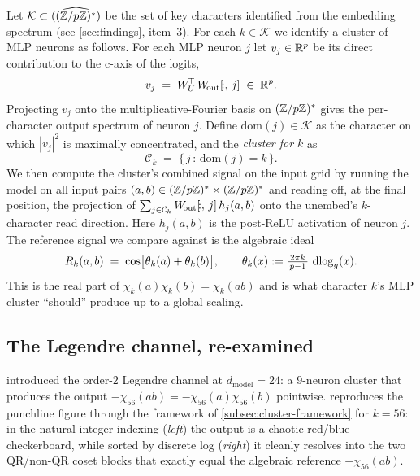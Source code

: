 Let $\mathcal{K} \subset \widehat{((\mathbb{Z}/p\mathbb{Z})^*)}$ be the set of key
characters identified from the embedding spectrum (see
\cref{sec:findings}, item~3).  For each $k \in \mathcal{K}$ we identify
a cluster of MLP neurons as follows.  For each MLP neuron $j$ let
$v_j \in \mathbb{R}^p$ be its direct contribution to the c-axis of the logits,
\begin{equation}
  v_j \;=\; W_U^{\!\top}\,W_{\!\text{out}}[\!:,\,j] \;\in\; \mathbb{R}^p.
  \label{eq:cluster-vj}
\end{equation}
Projecting $v_j$ onto the multiplicative-Fourier basis on $(\mathbb{Z}/p\mathbb{Z})^*$
gives the per-character output spectrum of neuron $j$.  Define
$\mathrm{dom}(j) \in \mathcal{K}$ as the character on which $|v_j|^2$ is
maximally concentrated, and the \emph{cluster for $k$} as
\begin{equation}
  \mathcal{C}_k \;=\; \{\,j \,:\, \mathrm{dom}(j) = k\,\}.
\end{equation}
We then compute the cluster's combined signal on the input grid by
running the model on all input pairs $(a, b) \in (\mathbb{Z}/p\mathbb{Z})^* \times
(\mathbb{Z}/p\mathbb{Z})^*$ and reading off, at the final position, the projection of
$\sum_{j \in \mathcal{C}_k} W_{\!\text{out}}[\!:,\,j]\,h_j(a, b)$ onto the
unembed's $k$-character read direction.  Here $h_j(a, b)$ is the
post-ReLU activation of neuron $j$.  The reference signal we compare
against is the algebraic ideal
\begin{equation}
  R_k(a, b) \;=\; \cos\!\big[\theta_k(a) + \theta_k(b)\big],
  \qquad \theta_k(x) := \tfrac{2\pi k}{\,p-1\,}\,\operatorname{dlog}_g(x).
  \label{eq:reference-Rk}
\end{equation}
This is the real part of $\chi_k(a)\chi_k(b) = \chi_k(ab)$ and is what
character $k$'s MLP cluster ``should'' produce up to a global scaling.

\subsection{The Legendre channel, re-examined}
\label{subsec:legendre-relooked}

 introduced the order-$2$ Legendre channel
at $d_{\text{model}} = 24$: a $9$-neuron cluster that produces the
output $-\chi_{56}(ab) = -\chi_{56}(a)\chi_{56}(b)$ pointwise.
 reproduces the punchline figure
through the framework of \cref{subsec:cluster-framework} for
$k = 56$: in the natural-integer indexing (\emph{left}) the output is
a chaotic red/blue checkerboard, while sorted by discrete log
(\emph{right}) it cleanly resolves into the two QR/non-QR coset blocks
that exactly equal the algebraic reference $-\chi_{56}(ab)$.

